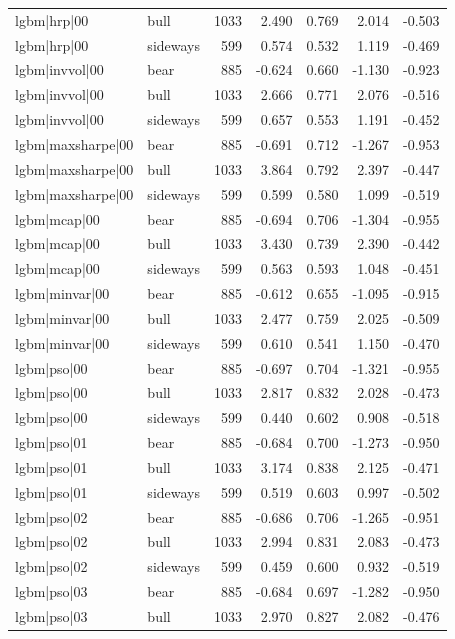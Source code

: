 \begin{table}
\begin{tabular}{llrrrrr}
lgbm|hrp|00 & bull & 1033 & 2.490 & 0.769 & 2.014 & -0.503 \\
lgbm|hrp|00 & sideways & 599 & 0.574 & 0.532 & 1.119 & -0.469 \\
lgbm|invvol|00 & bear & 885 & -0.624 & 0.660 & -1.130 & -0.923 \\
lgbm|invvol|00 & bull & 1033 & 2.666 & 0.771 & 2.076 & -0.516 \\
lgbm|invvol|00 & sideways & 599 & 0.657 & 0.553 & 1.191 & -0.452 \\
lgbm|maxsharpe|00 & bear & 885 & -0.691 & 0.712 & -1.267 & -0.953 \\
lgbm|maxsharpe|00 & bull & 1033 & 3.864 & 0.792 & 2.397 & -0.447 \\
lgbm|maxsharpe|00 & sideways & 599 & 0.599 & 0.580 & 1.099 & -0.519 \\
lgbm|mcap|00 & bear & 885 & -0.694 & 0.706 & -1.304 & -0.955 \\
lgbm|mcap|00 & bull & 1033 & 3.430 & 0.739 & 2.390 & -0.442 \\
lgbm|mcap|00 & sideways & 599 & 0.563 & 0.593 & 1.048 & -0.451 \\
lgbm|minvar|00 & bear & 885 & -0.612 & 0.655 & -1.095 & -0.915 \\
lgbm|minvar|00 & bull & 1033 & 2.477 & 0.759 & 2.025 & -0.509 \\
lgbm|minvar|00 & sideways & 599 & 0.610 & 0.541 & 1.150 & -0.470 \\
lgbm|pso|00 & bear & 885 & -0.697 & 0.704 & -1.321 & -0.955 \\
lgbm|pso|00 & bull & 1033 & 2.817 & 0.832 & 2.028 & -0.473 \\
lgbm|pso|00 & sideways & 599 & 0.440 & 0.602 & 0.908 & -0.518 \\
lgbm|pso|01 & bear & 885 & -0.684 & 0.700 & -1.273 & -0.950 \\
lgbm|pso|01 & bull & 1033 & 3.174 & 0.838 & 2.125 & -0.471 \\
lgbm|pso|01 & sideways & 599 & 0.519 & 0.603 & 0.997 & -0.502 \\
lgbm|pso|02 & bear & 885 & -0.686 & 0.706 & -1.265 & -0.951 \\
lgbm|pso|02 & bull & 1033 & 2.994 & 0.831 & 2.083 & -0.473 \\
lgbm|pso|02 & sideways & 599 & 0.459 & 0.600 & 0.932 & -0.519 \\
lgbm|pso|03 & bear & 885 & -0.684 & 0.697 & -1.282 & -0.950 \\
lgbm|pso|03 & bull & 1033 & 2.970 & 0.827 & 2.082 & -0.476 \\

\end{tabular}
\end{table}
